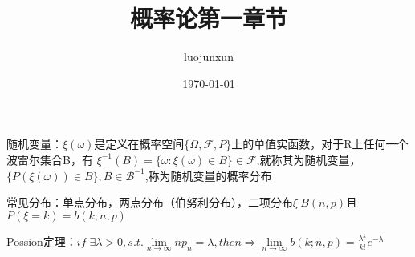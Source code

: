 \documentclass[12pt, a4paper, oneside]{ctexart}
\title{\huge\textbf{概率论第一章节}}
\author{luojunxun}
\date{\today}
\begin{document}
\maketitle

随机变量：$\xi(\omega)$是定义在概率空间$\{\Omega,\mathcal{F},P\}$上的单值实函数，对于R上任何一个波雷尔集合B，有
$\xi^{-1}(B)=\{\omega:\xi(\omega)\in B\}\in\mathcal{F}$,就称其为随机变量，$\{P(\xi(\omega))\in B\},B\in\mathcal{B}^{-1}$,称为随机变量的概率分布

常见分布：单点分布，两点分布（伯努利分布），二项分布$\xi ~ B(n,p)$且$P(\xi = k)=b(k;n,p)$

Possion定理：$if\;\exists\lambda>0,s.t.\lim\limits_{n\to\infty}np_n=\lambda,then\Rightarrow \lim\limits_{n\to\infty}b(k;n,p)=\frac{\lambda^k}{k!}e^{-\lambda} $





















% 
% 
\end{document}
